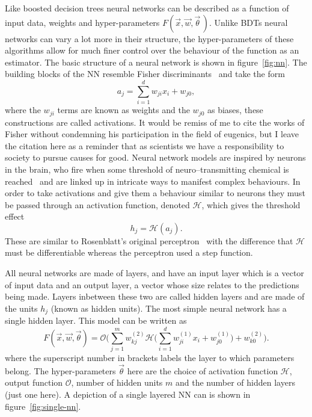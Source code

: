 Like boosted decision trees neural networks can be described as a function of
input data, weights and hyper-parameters $F(\vec{x}, \vec{w}, \vec{\theta} \,)$.
Unlike BDTs neural networks can vary a lot more in their structure, the
hyper-parameters of these algorithms allow for much finer control over the
behaviour of the function as an estimator. The basic structure of a neural
network is shown in figure~\ref{fig:nn}.  The building blocks of the NN resemble
Fisher discriminants~\cite{Fisher} and take the form
\begin{equation}
a_j = \sum_{i=1}^{d} w_{ji}x_{i} + w_{j0},
\label{eq:fisher}
\end{equation}
where the $w_{ji}$ terms are known as weights and the $w_{j0}$ as biases, these
constructions are called activations. It would be remiss of me to cite the works
of Fisher without condemning his participation in the field of eugenics, but I
leave the citation here as a reminder that as scientists we have a
responsibility to society to pursue causes for good. Neural network models are
inspired by neurons in the brain, who fire when some threshold of
neuro--transmitting chemical is reached~\cite{biology} and are linked up in
intricate ways to manifest complex behaviours. In order to take activations and
give them a behaviour similar to neurons they must be passed through an
activation function, denoted $\mathcal{H}$, which gives the threshold effect
\begin{equation}
h_j = \mathcal{H}(a_j).
\label{eq:hiddenunit}
\end{equation}
These are similar to Rosenblatt's original perceptron~\cite{Rosenblatt} with the
difference that $\mathcal{H}$ must be differentiable whereas the perceptron used
a step function.

All neural networks are made of layers, and have an input layer which is a
vector of input data and an output layer, a vector whose size relates to the
predictions being made. Layers inbetween these two are called hidden layers and
are made of the units $h_j$ (known as hidden units). The most simple neural
network has a single hidden layer. This model can be written as
\begin{equation}
F(\vec{x},\vec{w}, \vec{\theta}) = \mathcal{O} \Bigg( \sum_{j=1}^{m} w_{kj}^{(2)}
\mathcal{H} \Bigg( \sum_{i=1}^{d} w_{ji}^{(1)} x_{i} + w_{j0}^{(1)} \Bigg) + w_{k0}^{(2)} \Bigg).
\label{eq:basicnn}
\end{equation}
where the superscript number in brackets labels the layer to which parameters
belong. The hyper-parameters $\vec{\theta}$ here are the choice of activation
function $\mathcal{H}$, output function $\mathcal{O}$, number of hidden units
$m$ and the number of hidden layers (just one here). A depiction of a single
layered NN can is shown in figure~\ref{fig:single-nn}.


